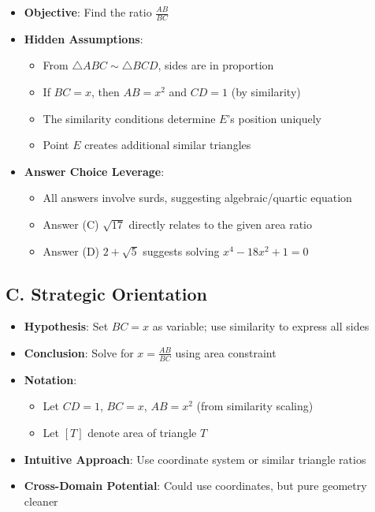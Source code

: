 \documentclass[]{article}
\begin{document}
\begin{problemconfigbox}
\begin{itemize}[leftmargin=*]
    \item \textbf{Objective}: Find the ratio $\frac{AB}{BC}$
    
    \item \textbf{Hidden Assumptions}:
    \begin{itemize}
        \item From $\triangle ABC \sim \triangle BCD$, sides are in proportion
        \item If $BC = x$, then $AB = x^2$ and $CD = 1$ (by similarity)
        \item The similarity conditions determine $E$'s position uniquely
        \item Point $E$ creates additional similar triangles
    \end{itemize}
    
    \item \textbf{Answer Choice Leverage}: 
    \begin{itemize}
        \item All answers involve surds, suggesting algebraic/quartic equation
        \item Answer (C) $\sqrt{17}$ directly relates to the given area ratio
        \item Answer (D) $2 + \sqrt{5}$ suggests solving $x^4 - 18x^2 + 1 = 0$
    \end{itemize}
\end{itemize}

\subsection*{C. Strategic Orientation}
\begin{itemize}[leftmargin=*]
    \item \textbf{Hypothesis}: Set $BC = x$ as variable; use similarity to express all sides
    \item \textbf{Conclusion}: Solve for $x = \frac{AB}{BC}$ using area constraint
    \item \textbf{Notation}: 
    \begin{itemize}
        \item Let $CD = 1$, $BC = x$, $AB = x^2$ (from similarity scaling)
        \item Let $[T]$ denote area of triangle $T$
    \end{itemize}
    \item \textbf{Intuitive Approach}: Use coordinate system or similar triangle ratios
    \item \textbf{Cross-Domain Potential}: Could use coordinates, but pure geometry cleaner
\end{itemize}
\end{problemconfigbox}
\end{document}
